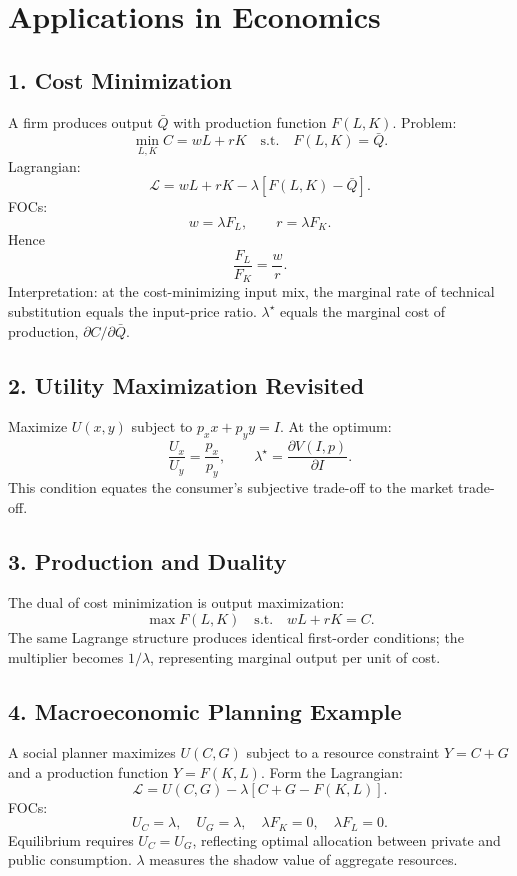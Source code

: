 \documentclass[12pt]{article}
\newcommand{\Lag}{\mathcal{L}}
\begin{document}
\section*{Applications in Economics}

\subsection*{1. Cost Minimization}

A firm produces output \(\bar Q\) with production function \(F(L,K)\).  
Problem:
\[
\min_{L,K} C=wL+rK \quad \text{s.t.} \quad F(L,K)=\bar Q.
\]
Lagrangian:
\[
\Lag=wL+rK-\lambda[F(L,K)-\bar Q].
\]
FOCs:
\[
w=\lambda F_L,\qquad r=\lambda F_K.
\]
Hence
\[
\frac{F_L}{F_K}=\frac{w}{r}.
\]
Interpretation: at the cost-minimizing input mix, the marginal rate of technical substitution equals the input-price ratio.  
\(\lambda^\star\) equals the marginal cost of production, \( \partial C/\partial \bar Q.\)

\subsection*{2. Utility Maximization Revisited}

Maximize \(U(x,y)\) subject to \(p_xx+p_yy=I.\)  
At the optimum:
\[
\frac{U_x}{U_y}=\frac{p_x}{p_y},\qquad \lambda^\star=\frac{\partial V(I,p)}{\partial I}.
\]
This condition equates the consumer’s subjective trade-off to the market trade-off.

\subsection*{3. Production and Duality}

The dual of cost minimization is output maximization:
\[
\max F(L,K) \quad \text{s.t.} \quad wL+rK=C.
\]
The same Lagrange structure produces identical first-order conditions; the multiplier becomes \(1/\lambda\), representing marginal output per unit of cost.

\subsection*{4. Macroeconomic Planning Example}

A social planner maximizes \(U(C,G)\) subject to a resource constraint \(Y=C+G\) and a production function \(Y=F(K,L)\).  
Form the Lagrangian:
\[
\Lag=U(C,G)-\lambda[C+G-F(K,L)].
\]
FOCs:
\[
U_C=\lambda,\quad U_G=\lambda,\quad \lambda F_K=0,\quad \lambda F_L=0.
\]
Equilibrium requires \(U_C=U_G\), reflecting optimal allocation between private and public consumption.  
\(\lambda\) measures the shadow value of aggregate resources.
\end{document}
